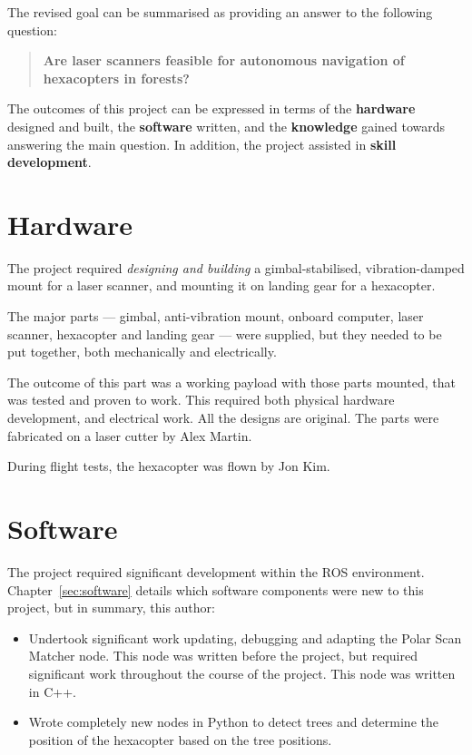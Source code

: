 \documentclass[12pt,oneside,a4paper]{book}
\begin{document}
The revised goal can be summarised as providing an answer to the
following question:
\begin{quote}
  \textbf{Are laser scanners feasible for autonomous navigation of
    hexacopters in forests?}
\end{quote}

The outcomes of this project can be expressed in terms of the
\textbf{hardware} designed and built, the \textbf{software} written,
and the \textbf{knowledge} gained towards answering the main
question. In addition, the project assisted in \textbf{skill
  development}.

\section{Hardware}
\label{sec:hardware-1}

The project required \emph{designing and building} a
gimbal-stabilised, vibration-damped mount for a laser scanner, and
mounting it on landing gear for a hexacopter.

The major parts --- gimbal, anti-vibration mount, onboard computer, laser
scanner, hexacopter and landing gear --- were supplied, but they needed
to be put together, both mechanically and electrically.

The outcome of this part was a working payload with those parts
mounted, that was tested and proven to work. This required both
physical hardware development, and electrical work. All the designs
are original. The parts were fabricated on a laser cutter by Alex
Martin.

During flight tests, the hexacopter was flown by Jon Kim.

\section{Software}
\label{sec:software-1}

The project required significant development within the \gls{ROS}
environment. Chapter~\ref{sec:software} details which software
components were new to this project, but in summary, this author:
\begin{itemize}
\item Undertook significant work updating, debugging and adapting the
  Polar Scan Matcher node. This node was written before the project,
  but required significant work throughout the course of the
  project. This node was written in C++.
\item Wrote completely new nodes in Python to detect trees and
  determine the position of the hexacopter based on the tree
  positions.
\end{itemize}
\end{document}

